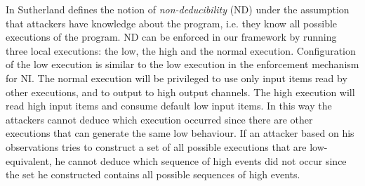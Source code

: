 \documentclass[10pt,a4paper,oneside]{article}
\begin{document}
In \cite{Suth-86-SP} Sutherland defines the notion of \emph{non-deducibility} (ND) under the assumption that attackers have knowledge about the program, i.e. they know all possible executions of the program. ND can be enforced in our framework by running three local executions: the low, the high and the normal execution. Configuration of the low execution is similar to the low execution in the enforcement mechanism for NI. The normal execution will be privileged to use only input items read by other executions, and to output to high output channels. The high execution will read high input items and consume default low input items. In this way the attackers cannot deduce which execution occurred since there are other executions that can generate the same low behaviour. If an attacker based on his observations tries to construct a set of all possible executions that are low-equivalent, he cannot deduce which sequence of high events did not occur since the set he constructed contains all possible sequences of high events.


\iffalse{
With the idea of enforcing ND, it is further interesting to investigate enforcement of generalized non-interference (GNI) \cite{McCullough-88-TR} (defined based on NI and ND), non-inference (NF) \cite{OHalloran-90}, separability (SEP) \cite{McLe-94-SP,ZAKI-LEE-97-SP} (defined based on a generalization of GNF, NF, and GNI), perfect security property (PSP) \cite{ZAKI-LEE-97-SP} (defined by lessening the constraints on the definition of SEP), and pretty good security property (PGSP) \cite{MANT-00-CSF} (defined by loosening the conditions on high input events).
}\fi
\end{document}
